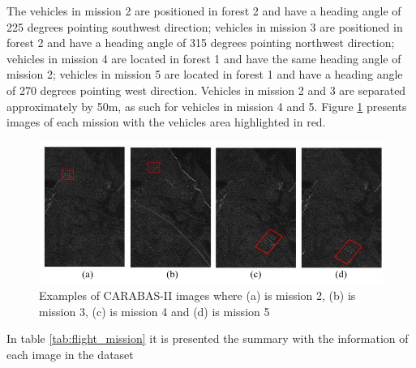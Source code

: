 The vehicles in mission 2 are positioned in forest 2 and have a heading angle of 225 degrees pointing southwest direction;
vehicles in mission 3 are positioned in forest 2 and have a heading angle of 315 degrees pointing northwest direction;
vehicles in mission 4 are located in forest 1 and have the same heading angle of mission 2;
vehicles in mission 5 are located in forest 1 and have a heading angle of 270 degrees pointing west direction.
Vehicles in mission 2 and 3 are separated approximately by 50m, as such for vehicles in mission 4 and 5.
Figure \ref{fig:carabas_vehicles} presents images of each mission with the vehicles area highlighted in red.

\begin{figure}[h]
    \centering
    \includegraphics{chapter6/carabas_vehicles.jpg}
    \caption{Examples of CARABAS-II images where (a) is mission 2, (b) is mission 3, (c) is mission 4 and (d)
    is mission 5}
    \label{fig:carabas_vehicles}
\end{figure}

In table \ref{tab:flight_mission} it is presented the summary with the information of each image in the dataset

